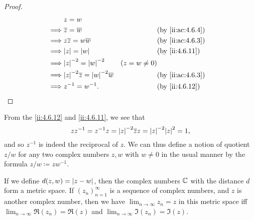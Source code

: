 \begin{proof}
  \begin{align*}
             & z = w                                                                                     \\
    \implies & \overline{z} = \overline{w}                           &                & \by{ii:ac:4.6.4} \\
    \implies & z \overline{z} = w \overline{w}                       &                & \by{ii:ac:4.6.3} \\
    \implies & \abs{z} = \abs{w}                                     &                & \by{ii:4.6.11}   \\
    \implies & \abs{z}^{-2} = \abs{w}^{-2}                           & (z = w \neq 0)                    \\
    \implies & \abs{z}^{-2} \overline{z} = \abs{w}^{-2} \overline{w} &                & \by{ii:ac:4.6.3} \\
    \implies & z^{-1} = w^{-1}.                                      &                & \by{ii:4.6.12}
  \end{align*}
\end{proof}

\begin{note}
  From the \cref{ii:4.6.12} and \cref{ii:4.6.11}, we see that
  \[
    z z^{-1} = z^{-1} z = \abs{z}^{-2} \overline{z} z = \abs{z}^{-2} \abs{z}^2 = 1,
  \]
  and so \(z^{-1}\) is indeed the reciprocal of \(z\).
  We can thus define a notion of quotient \(z / w\) for any two complex numbers \(z, w\) with \(w \neq 0\) in the usual manner by the formula \(z / w \coloneqq z w^{-1}\).
\end{note}

\begin{lem}\label{ii:4.6.13}
  If we define \(d(z, w) = \left\lvert z - w\right\rvert\), then the complex numbers \(\mathbb{C}\) with the distance \(d\) form a metric space.
  If \((z_n)_{n = 1}^\infty\) is a sequence of complex numbers, and \(z\) is another complex number, then we have \(\lim_{n \to \infty} z_n = z\) in this metric space iff \(\lim_{n \to \infty} \Re(z_n) = \Re(z)\) and \(\lim_{n \to \infty} \Im(z_n) = \Im(z)\).
\end{lem}

